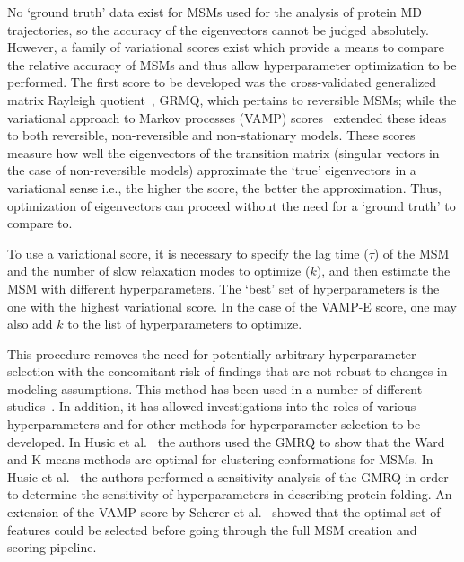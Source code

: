 \documentclass[journal=jacsat,manuscript=article]{achemso}
\begin{document}
No `ground truth' data exist for MSMs used for the analysis of protein MD trajectories, so the accuracy of the eigenvectors cannot be judged absolutely. However, a family of variational scores exist which provide a means to compare the relative accuracy of MSMs and thus allow hyperparameter optimization to be performed. The first score to be developed was the cross-validated generalized matrix Rayleigh quotient~\cite{mcgibbonVariationalCrossvalidationSlow2015}, GRMQ, which pertains to reversible MSMs; while the variational approach to Markov processes (VAMP) scores~\cite{wuVariationalApproachLearning2020c,scherer_variational_2019} extended these ideas to both reversible, non-reversible and non-stationary models. These scores measure how well the eigenvectors of the transition matrix (singular vectors in the case of non-reversible models) approximate the `true' eigenvectors in a variational sense i.e., the higher the score, the better the approximation. Thus, optimization of eigenvectors can proceed without the need for a `ground truth' to compare to.   

To use a variational score, it is necessary to specify the lag time ($\tau$) of the MSM and the number of slow relaxation modes to optimize ($k$), and then estimate the MSM with different hyperparameters. The `best' set of hyperparameters is the one with the highest variational score. In the case of the VAMP-E score, one may also add $k$ to the list of hyperparameters to optimize. 

This procedure removes the need for potentially arbitrary hyperparameter selection with the concomitant risk of findings that are not robust to changes in modeling assumptions. This method has been used in a number of different studies~\cite{A_Minimum_2018, Adaptive_M2020, High-Resol2019, Maximizing2018, Modeling_t2017, Optimized_2016, Quantitati2018, VAMPnets_f2018, Variationa2018, Ward_Clust2017}. In addition, it has allowed investigations into the roles of various hyperparameters and for other methods for hyperparameter selection to be developed. In Husic et al.~
\cite{Ward_Clust2017} the authors used the GMRQ to show that the Ward and K-means methods are optimal for clustering conformations for MSMs. In Husic et al.~\cite{Optimized_2016} the authors performed a sensitivity analysis of the GMRQ  in order to determine the sensitivity of hyperparameters in describing protein folding.  An extension of the VAMP score by Scherer et al.~\cite{scherer_variational_2019} showed that the optimal set of features could be selected before going through the full MSM creation and scoring pipeline.  
\end{document}
